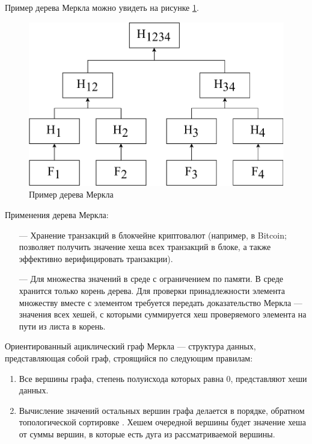 Пример дерева Меркла можно увидеть на рисунке \ref{fig:mtree}.

\begin{figure}[hbtp]
	\centering
	\includegraphics[width=\textwidth]{img/merkletree.pdf}
	\caption{Пример дерева Меркла}
	\label{fig:mtree}
\end{figure}

Применения дерева Меркла:
\begin{itemize}
	\item[---] Хранение транзакций в блокчейне криптовалют (например, в Bitcoin; позволяет получить значение хеша всех транзакций в блоке, а также эффективно верифицировать транзакции).
	\item[---] Для множества значений в среде с ограничением по памяти. В среде хранится только корень дерева. Для проверки принадлежности элемента множеству вместе с элементом требуется передать доказательство Меркла --- значения всех хешей, с которыми суммируется хеш проверяемого элемента на пути из листа в корень.
\end{itemize}

Ориентированный ациклический граф Меркла \cite{merkledag} --- структура данных, представляющая собой граф, строящийся по следующим правилам:
\begin{enumerate}
	\item Все вершины графа, степень полуисхода \cite{graphs} которых равна 0, представляют хеши данных.
	\item Вычисление значений остальных вершин графа делается в порядке, обратном топологической сортировке \cite{topsort}. Хешем очередной вершины будет значение хеша от суммы вершин, в которые есть дуга из рассматриваемой вершины.
\end{enumerate}

